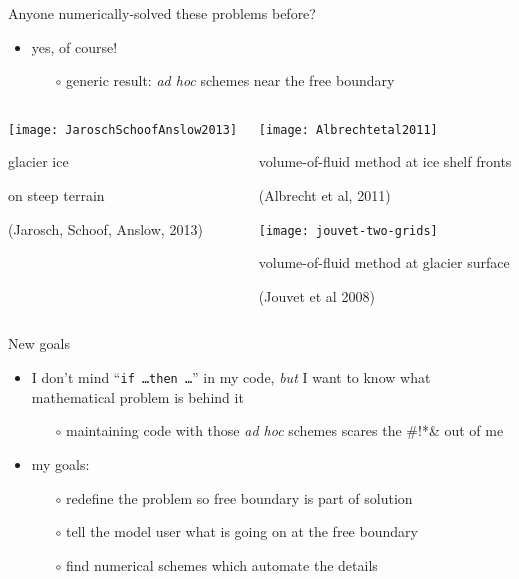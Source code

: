 \documentclass{beamer}
\begin{document}
\begin{frame}{Anyone numerically-solved these problems before?}

  \begin{itemize}
  \item yes, of course!
    \begin{itemize}
    \item[$\circ$] generic result: \emph{ad hoc} schemes near the free boundary
    \end{itemize}
  \end{itemize}

\medskip
\begin{columns}
\begin{column}{0.3\textwidth}
\texttt{[image: JaroschSchoofAnslow2013]}

\small glacier ice

on steep terrain

\smallskip
\tiny (Jarosch, Schoof, Anslow, 2013)
\end{column}

\begin{column}{0.6\textwidth}
\texttt{[image: Albrechtetal2011]}

\small volume-of-fluid method at ice shelf fronts

\tiny (Albrecht et al, 2011)

\small \medskip
\texttt{[image: jouvet-two-grids]}

\small volume-of-fluid method at glacier surface

\tiny (Jouvet et al 2008)
\end{column}
\end{columns}
\end{frame}


\begin{frame}{New goals}

  \begin{itemize}
  \item I don't mind ``\texttt{if \dots then \dots}'' in my code, \emph{but} I want to know what mathematical problem is behind it
    \begin{itemize}
    \item[$\circ$] maintaining code with those \emph{ad hoc} schemes scares the \#!*\& out of me
    \end{itemize}
  \item my goals:
    \begin{itemize}
    \item[$\circ$]
       \alert{redefine the problem so free boundary is part of solution}
    \item[$\circ$]
       \alert{tell the model user what is going on at the free boundary}
    \item[$\circ$]
       \alert{find numerical schemes which automate the details}
    \end{itemize}
  \end{itemize}
\end{frame}
\end{document}
